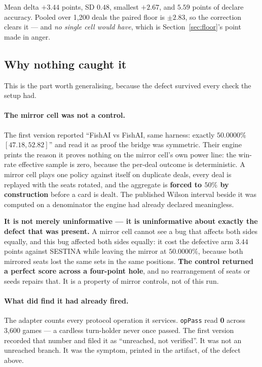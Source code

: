\documentclass[11pt]{article}
\newcommand{\code}[1]{\texttt{#1}}
\begin{document}
Mean delta $+3.44$ points, SD $0.48$, smallest $+2.67$, and $5.59$ points of declare accuracy.
Pooled over 1{,}200 deals the paired floor is $\pm 2.83$, so the correction clears it --- and
\emph{no single cell would have}, which is Section~\ref{sec:floor}'s point made in anger.

\subsection{Why nothing caught it}
\label{sec:whynothing}

This is the part worth generalising, because the defect survived every check the setup had.

\paragraph{The mirror cell was not a control.} The first version reported ``FishAI vs FishAI, same
harness: exactly $50.0000\%$ $[47.18, 52.82]$'' and read it as proof the bridge was symmetric. Their
engine prints the reason it proves nothing on the mirror cell's own power line: the win-rate
effective sample is zero, because the per-deal outcome is deterministic. A mirror cell plays one
policy against itself on duplicate deals, every deal is replayed with the seats rotated, and the
aggregate is \textbf{forced to $50\%$ by construction} before a card is dealt. The published Wilson
interval beside it was computed on a denominator the engine had already declared meaningless.

\textbf{It is not merely uninformative --- it is uninformative about exactly the defect that was
present.} A mirror cell cannot see a bug that affects both sides equally, and this bug affected both
sides equally: it cost the defective arm $3.44$ points against SESTINA while leaving the mirror at
$50.0000\%$, because both mirrored seats lost the same sets in the same positions. \textbf{The
control returned a perfect score across a four-point hole}, and no rearrangement of seats or seeds
repairs that. It is a property of mirror controls, not of this run.

\paragraph{What did find it had already fired.} The adapter counts every protocol operation it
services. \code{opPass} read \textbf{0} across 3{,}600 games --- a cardless turn-holder never once
passed. The first version recorded that number and filed it as ``unreached, not verified''. It was
not an unreached branch. It was the symptom, printed in the artifact, of the defect above.
\end{document}

